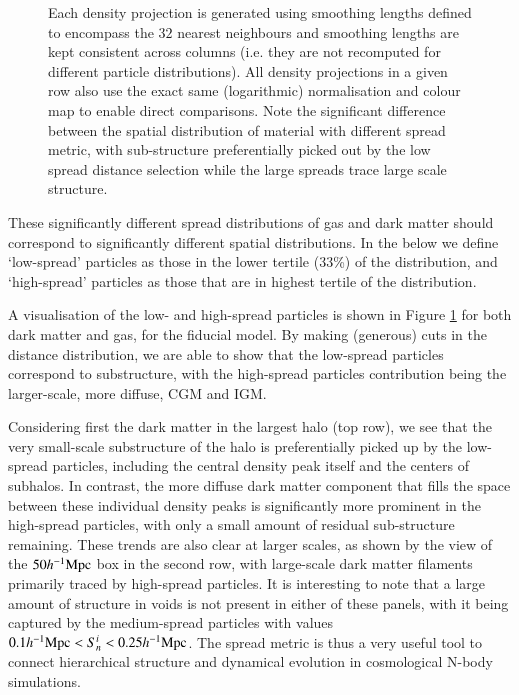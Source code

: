 \begin{figure}
{    Each density projection is generated using smoothing
    lengths defined to encompass the $32$ nearest neighbours
    and smoothing lengths are kept consistent across
    columns (i.e. they are not recomputed for different particle distributions). All density projections in a given row also
    use the exact same (logarithmic) normalisation and colour map to enable direct
    comparisons. Note 
    the significant difference between the spatial distribution of material with different spread metric, with sub-structure preferentially picked out by the low spread distance selection while the large spreads trace large scale structure.
    }
    \vspace{1cm}
    \label{fig:bigdistanceimage}
\end{figure}

These significantly different spread distributions of gas and dark matter should correspond to
significantly different spatial distributions. In the below we define
`low-spread' particles as those in the lower tertile (33\%) of the
distribution, and `high-spread' particles as those that are in highest
tertile of the distribution.

A visualisation of the low- and high-spread particles is shown in Figure
\ref{fig:bigdistanceimage} for both dark matter and gas, for the fiducial
\simba{} model. By making (generous) cuts in the distance distribution, we
are able to show that the low-spread particles correspond to substructure,
with the high-spread particles contribution being the larger-scale, more
diffuse, CGM and IGM.

Considering first the dark matter in the largest halo (top row),
we see that the very small-scale substructure of the halo is preferentially picked up by the low-spread particles, including the central
density peak itself and the centers of subhalos. In contrast, the more diffuse dark matter component that fills the space between these individual
density peaks is significantly more prominent in the high-spread particles, with only a small
amount of residual sub-structure remaining. These trends are also clear at larger scales, as shown by the view of the $50h^{-1}{\rm Mpc}{}$ box in the second row, with large-scale dark matter
filaments primarily traced by high-spread particles. It is interesting to note that
a large amount of structure in voids is not present in either of these
panels, with it being captured by the medium-spread particles with values $0.1h^{-1}{\rm Mpc}{} < S_{n}^{i} < 0.25 h^{-1}{\rm Mpc}{}$. The spread metric is thus a very useful tool to connect hierarchical structure and dynamical evolution in cosmological N-body simulations.

